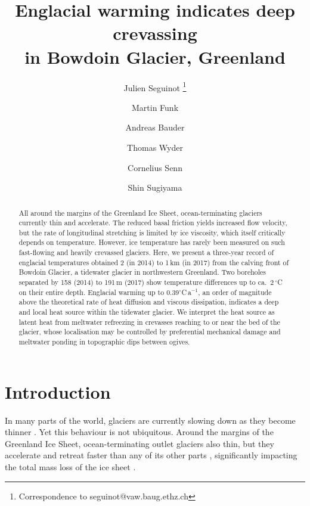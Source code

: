 \documentclass[utf8]{article}
\title{Englacial warming indicates deep crevassing\\
       in Bowdoin Glacier, Greenland}
\author[1]{Julien Seguinot
           \thanks{Correspondence to seguinot@vaw.baug.ethz.ch}}
\author[1]{Martin Funk}
\author[1]{Andreas Bauder}
\author[1]{Thomas Wyder}
\author[2]{Cornelius Senn}
\author[3]{Shin Sugiyama}
\affil[1]{Laboratory of Hydraulics, Hydrology and Glaciology,
          ETH Zürich, Switzerland}
\affil[2]{Department of Civil, Environmental and Geomatic Engineering,
          ETH Zürich, Switzerland}
\affil[3]{Institute of Low Temperature Science, Hokkaido University,
          Sapporo, Japan}
\begin{document}

\maketitle

\begin{abstract}

    All around the margins of the Greenland Ice Sheet, ocean-terminating
    glaciers currently thin and accelerate. The reduced basal friction yields
    increased flow velocity, but the rate of longitudinal stretching is limited
    by ice viscosity, which itself critically depends
    on temperature. However, ice temperature has rarely
    been measured on such fast-flowing and heavily crevassed glaciers.
    Here, we present a three-year record of englacial temperatures obtained
    2 (in 2014) to 1\,km (in 2017) from the calving front of Bowdoin Glacier, a
    tidewater glacier in northwestern Greenland. Two boreholes separated by 158
    (2014) to 191\,m (2017) show temperature differences up to ca.~2\,$^\circ$C
    on their entire depth. Englacial warming up to
    0.39$^\circ$C\,a$^{-1}$, an order of magnitude above the theoretical rate
    of heat diffusion and viscous dissipation, indicates a deep and local heat
    source within the tidewater glacier.
    We interpret the heat source as latent heat from meltwater refreezing in
    crevasses reaching to or near the bed of the glacier, whose localisation
    may be controlled by preferential mechanical damage and meltwater ponding
    in topographic dips between ogives.

\end{abstract}

\section{Introduction}

    In many parts of the world, glaciers are currently slowing down as they
    become thinner \citep{Heid.Kaab.2012, Dehecq.etal.2018}. Yet this behaviour
    is not ubiquitous. Around the margins of
    the Greenland Ice Sheet, ocean-terminating outlet glaciers also thin, but
    they accelerate and retreat faster than any of its other parts
    \citep[e.g.,][]{Krabill.etal.2000, Rignot.Kanagaratnam.2006,
    Pritchard.etal.2009, Hill.etal.2017}, significantly impacting the total
    mass loss of the ice sheet \citep[e.g.,][]{Enderlin.etal.2014,
    Khan.etal.2015, McMillan.etal.2016}.
\end{document}
